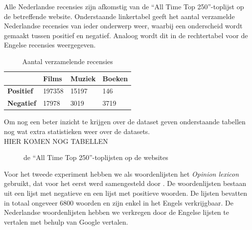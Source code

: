 Alle Nederlandse recensies zijn afkomstig van de ``All Time Top 250''-toplijst op de betreffende website. Onderstaande linkertabel geeft het aantal verzamelde Nederlandse recensies van ieder onderwerp weer, waarbij een onderscheid wordt gemaakt tussen positief en negatief. Analoog wordt dit in de rechtertabel voor de Engelse recensies weergegeven.\\

\begin{table}[h]
\centering
\begin{tabular}{l|l|l|l|}
\cline{2-4}
                                        & \textbf{Films} & \textbf{Muziek} & \textbf{Boeken} \\ \hline
\multicolumn{1}{|l|}{\textbf{Positief}} & 197358         & 15197           & 146             \\ \hline
\multicolumn{1}{|l|}{\textbf{Negatief}} & 17978          & 3019            & 3719            \\ \hline
\end{tabular}
\caption{Aantal verzamelende recensies} 
\end{table}


Om nog een beter inzicht te krijgen over de dataset geven onderstaande tabellen nog wat extra statistieken weer over de datasets.\\
HIER KOMEN NOG TABELLEN\\

\newpage
\begin{figure}%
    \centering
    \caption{de ``All Time Top 250''-toplijsten op de websites}%
\end{figure}


Voor het tweede experiment hebben we als woordenlijsten het \textit{Opinion lexicon} gebruikt, dat voor het eerst werd samengesteld door \cite{hu2004mining}. De woordenlijsten bestaan uit een lijst met negatieve en een lijst met positieve woorden. De lijsten bevatten in totaal ongeveer 6800 woorden en zijn enkel in het Engels verkrijgbaar. De Nederlandse woordenlijsten hebben we verkregen door de Engelse lijsten te vertalen met behulp van Google vertalen.\\

